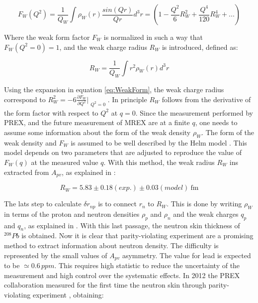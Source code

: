\begin{equation} \label{eq:WeakForm}
F_{W}(Q^{2}) = \frac{1}{Q_{W}} \int \rho_{W}(r) \dfrac{sin(Qr)}{Qr} d^{3}r = (1 - \frac{Q^{2}}{6} R^{2}_{W} + \frac{Q^{4}}{120}R^{4}_{W} + ...)  
\end{equation}

Where the weak form factor $F_{W}$ is normalized in such a way that $F_{W}(Q^{2} = 0) = 1$, and  the weak charge radius $R_{W}$ is introduced, defined as:

\begin{equation}
R_{W} = \frac{1}{Q_{W}} \int r^{2} \rho_{W}(r) d^{3}r
\end{equation}

Using the expansion in equation \ref{eq:WeakForm}, the weak charge radius correspond to $R^{2}_{W} = -6 \frac{\partial F_{W}}{\partial Q^{2}}\Bigr|_{\substack{Q^{2} = 0}}$. In principle $R_{W}$ follows from the derivative of the form factor with respect to $Q^{2}$ at $q = 0$. Since the measurement performed by PREX, and the future measurement of MREX are at a finite $q$, one needs to assume some information about the form of the weak density $\rho_{W}$. The form of the weak density and $F_{W}$ is assumed to be well described by the Helm model \cite{PhysRev.104.1466}. This model depends on two parameters that are adjusted to reproduce the value of $F_{W}(q)$ at the measured value $q$. With this method, the weak radius $R_{W}$ ins extracted from $A_{pv}$, as explained in \cite{Horowitz:2012tj}:

\begin{equation}
R_{W} = 5.83 \pm 0.18 (exp.) \pm 0.03 (model) \SI{}{\femto \meter}
\end{equation}

The lats step to calculate $\delta r_{np}$ is to connect $r_{n}$ to $R_{W}$. This is done by writing $\rho_{W}$ in terms of the proton and neutron densities $\rho_{p}$ and $\rho_{n}$ and the weak charges $q_{p}$ and $q_{n}$, as explained in \cite{Horowitz:2012tj}. With this last passage, the neutron skin thickness of $^{208}Pb$ is obtained.
 Now it is clear that parity-violating experiment are a promising method to extract information about neutron density. The difficulty is represented by the small values of $A_{pv}$ asymmetry. The value for lead is expected to be $\simeq 0.6 \, ppm$. This requires high statistic to reduce the uncertainty of the measurement and high control over the systematic effects. In 2012 the PREX collaboration measured for the first time the neutron skin through parity-violating experiment \cite{Abrahamyan:2012gp}, obtaining:

